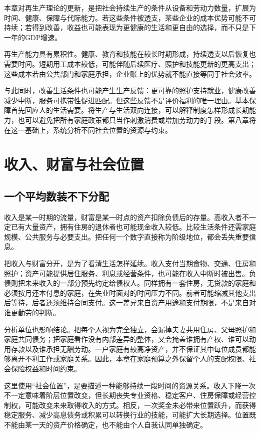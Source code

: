 \documentclass[UTF8,fontset=fandol,zihao=-4,oneside,openany]{ctexbook}
\begin{document}
本章对再生产理论的更新，是把社会持续生产的条件从设备和劳动力数量，扩展为时间、健康、保障与代际能力。若这些条件被透支，某些企业的成本优势可能不可持续；若得到改善，收益也可能表现为更健康的生活和更自由的选择，而不只是下一年的GDP增速。

\label{arg:P158}
再生产能力具有累积性。健康、教育和技能在较长时期形成，持续透支以后恢复也需要时间。短期用工成本较低，可能伴随后续医疗、照护和技能更新的更高支出；这些成本若由公共部门和家庭承担，企业账上的优势就不能直接等同于社会效率。

与此同时，改善生活条件也可能产生生产反馈：更可靠的照护支持就业，健康改善减少中断，服务可携带性促进匹配。但这些反馈不是评价福利的唯一理由。基本保障首先回应人的生活需要。将生产与生活双向连接，可以解释制度怎样形成长期能力，也可以避免把所有家庭政策都只当作刺激消费或增加劳动力的手段。第八章将在这一基础上，系统分析不同社会位置的资源与约束。


\chapter{收入、财富与社会位置}
\section{一个平均数装不下分配}
收入是某一时期的流量，财富是某一时点的资产扣除负债后的存量。高收入者不一定已有大量资产，拥有住房的退休者也可能现金收入较低。比较生活条件还需家庭规模、公共服务与必要支出。把任何一个数字直接称为阶级地位，都会丢失重要信息。

\label{arg:P159}
把收入与财富分开，是为了看清生活怎样延续。收入支付当期食物、交通、住房和照护；资产可能提供居住服务、利息或经营条件，也可能在收入中断时被出售。负债则把未来收入的一部分预先约定给债权人。同样拥有一套住房，无贷款的家庭和必须按月还本付息的家庭，在失业时面对的时间压力不同。前者可能缩减其他支出后等待，后者还须维持合同支付。这一差异来自资产用途和支付期限，不是来自对谁更勤劳的判断。

分析单位也影响结论。把每个人视为完全独立，会漏掉夫妻共用住房、父母照护和家庭共同债务；把家庭看作没有内部差异的整体，又会掩盖谁拥有产权、谁可以动用存款以及谁承担无酬劳动。一户家庭有较高净资产，并不保证其中每位成员都能够离开不利工作或家庭关系。因此，本章在家庭预算之外保留个人的支配权限、社会保险权益和时间约束。

这里使用“社会位置”，是要描述一种能够持续一段时间的资源关系。收入下降一次不一定意味着阶层位置改变，但长期丧失专业资格、稳定客户、住房保障或经营控制权，可能改变未来取得收入的方式。相反，一次奖金未必带来位置跃升，而获得稳定服务、减少高息债务或积累可以转换行业的技能，可能扩大长期选择。位置既不能由某一天的资产价格确定，也不能由个人自我认同单独确定。
\end{document}
